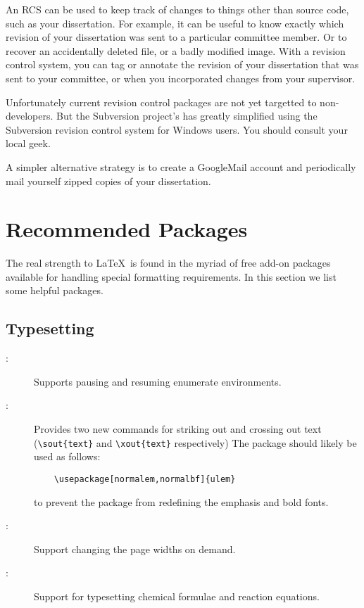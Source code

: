 An \ac{RCS} can be used to keep track of changes to things other
than source code, such as your dissertation.  For example, it can
be useful to know exactly which revision of your dissertation was
sent to a particular committee member.  Or to recover an accidentally
deleted file, or a badly modified image.  With a revision control
system, you can tag or annotate the revision of your dissertation
that was sent to your committee, or when you incorporated changes
from your supervisor.

Unfortunately current revision control packages are not yet targetted
to non-developers.  But the Subversion project's
has greatly simplified using the Subversion revision control system
for Windows users.  You should consult your local geek.

A simpler alternative strategy is to create a GoogleMail account
and periodically mail yourself zipped copies of your dissertation.

\section{Recommended Packages}

The real strength to \LaTeX\ is found in the myriad of free add-on
packages available for handling special formatting requirements.
In this section we list some helpful packages.

\subsection{Typesetting}

\begin{description}
\item[:]
    Supports pausing and resuming enumerate environments.

\item[:]
    Provides two new commands for striking out and crossing out text
    (\verb+\sout{text}+ and \verb+\xout{text}+ respectively)
    The package should likely
    be used as follows:
    \begin{verbatim}
    \usepackage[normalem,normalbf]{ulem}
    \end{verbatim}
    to prevent the package from redefining the emphasis and bold fonts.

\item[:]
    Support changing the page widths on demand.

\item[:] 
    Support for typesetting chemical formulae and reaction equations.

\end{description}

